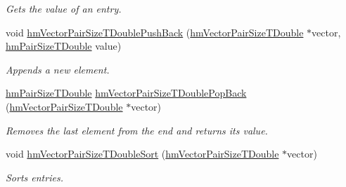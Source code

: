 \begin{DoxyCompactItemize}
\begin{DoxyCompactList}\small\item\em Gets the value of an entry. \end{DoxyCompactList}\item 
void \hyperlink{structhm_vector_pair_size_t_double_a30b058623bd848f4f5c1c320cbb494f1}{hm\-Vector\-Pair\-Size\-T\-Double\-Push\-Back} (\hyperlink{structhm_vector_pair_size_t_double}{hm\-Vector\-Pair\-Size\-T\-Double} $\ast$vector, \hyperlink{structhm_pair_size_t_double}{hm\-Pair\-Size\-T\-Double} value)
\begin{DoxyCompactList}\small\item\em Appends a new element. \end{DoxyCompactList}\item 
\hyperlink{structhm_pair_size_t_double}{hm\-Pair\-Size\-T\-Double} \hyperlink{structhm_vector_pair_size_t_double_a7852d46a9a74998d8e1087e97adf0043}{hm\-Vector\-Pair\-Size\-T\-Double\-Pop\-Back} (\hyperlink{structhm_vector_pair_size_t_double}{hm\-Vector\-Pair\-Size\-T\-Double} $\ast$vector)
\begin{DoxyCompactList}\small\item\em Removes the last element from the end and returns its value. \end{DoxyCompactList}\item 
void \hyperlink{structhm_vector_pair_size_t_double_accc85d682163cd80e24353b58cd8347d}{hm\-Vector\-Pair\-Size\-T\-Double\-Sort} (\hyperlink{structhm_vector_pair_size_t_double}{hm\-Vector\-Pair\-Size\-T\-Double} $\ast$vector)
\begin{DoxyCompactList}\small\item\em Sorts entries. \end{DoxyCompactList}\end{DoxyCompactItemize}
